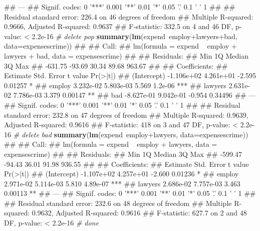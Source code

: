 \documentclass[11pt,]{article}
\newenvironment{Shaded}{\begin{snugshade}}{\end{snugshade}}
\newcommand{\KeywordTok}[1]{\textcolor[rgb]{0.13,0.29,0.53}{\textbf{{#1}}}}
\newcommand{\DataTypeTok}[1]{\textcolor[rgb]{0.13,0.29,0.53}{{#1}}}
\newcommand{\CommentTok}[1]{\textcolor[rgb]{0.56,0.35,0.01}{\textit{{#1}}}}
\newcommand{\NormalTok}[1]{{#1}}
\begin{document}
\begin{Shaded}
\begin{Highlighting}[]
\NormalTok{## ---}
\NormalTok{## Signif. codes:  0 '***' 0.001 '**' 0.01 '*' 0.05 '.' 0.1 ' ' 1}
\NormalTok{## }
\NormalTok{## Residual standard error: 226.4 on 46 degrees of freedom}
\NormalTok{## Multiple R-squared:  0.9666, Adjusted R-squared:  0.9637 }
\NormalTok{## F-statistic: 332.5 on 4 and 46 DF,  p-value: < 2.2e-16}
\CommentTok{# delete pop}
\KeywordTok{summary}\NormalTok{(}\KeywordTok{lm}\NormalTok{(expend~employ+lawyers+bad, }\DataTypeTok{data=}\NormalTok{expensescrime))}
\NormalTok{## }
\NormalTok{## Call:}
\NormalTok{## lm(formula = expend ~ employ + lawyers + bad, data = expensescrime)}
\NormalTok{## }
\NormalTok{## Residuals:}
\NormalTok{##     Min      1Q  Median      3Q     Max }
\NormalTok{## -631.75  -93.69   30.34   89.68  963.67 }
\NormalTok{## }
\NormalTok{## Coefficients:}
\NormalTok{##               Estimate Std. Error t value Pr(>|t|)    }
\NormalTok{## (Intercept) -1.106e+02  4.261e+01  -2.595  0.01257 *  }
\NormalTok{## employ       3.232e-02  5.803e-03   5.569  1.2e-06 ***}
\NormalTok{## lawyers      2.631e-02  7.786e-03   3.379  0.00147 ** }
\NormalTok{## bad         -8.627e-01  9.042e-01  -0.954  0.34496    }
\NormalTok{## ---}
\NormalTok{## Signif. codes:  0 '***' 0.001 '**' 0.01 '*' 0.05 '.' 0.1 ' ' 1}
\NormalTok{## }
\NormalTok{## Residual standard error: 232.8 on 47 degrees of freedom}
\NormalTok{## Multiple R-squared:  0.9639, Adjusted R-squared:  0.9616 }
\NormalTok{## F-statistic:   418 on 3 and 47 DF,  p-value: < 2.2e-16}
\CommentTok{# delete bad}
\KeywordTok{summary}\NormalTok{(}\KeywordTok{lm}\NormalTok{(expend~employ+lawyers, }\DataTypeTok{data=}\NormalTok{expensescrime))}
\NormalTok{## }
\NormalTok{## Call:}
\NormalTok{## lm(formula = expend ~ employ + lawyers, data = expensescrime)}
\NormalTok{## }
\NormalTok{## Residuals:}
\NormalTok{##     Min      1Q  Median      3Q     Max }
\NormalTok{## -599.47  -94.43   36.01   91.98  936.55 }
\NormalTok{## }
\NormalTok{## Coefficients:}
\NormalTok{##               Estimate Std. Error t value Pr(>|t|)    }
\NormalTok{## (Intercept) -1.107e+02  4.257e+01  -2.600  0.01236 *  }
\NormalTok{## employ       2.971e-02  5.114e-03   5.810 4.89e-07 ***}
\NormalTok{## lawyers      2.686e-02  7.757e-03   3.463  0.00113 ** }
\NormalTok{## ---}
\NormalTok{## Signif. codes:  0 '***' 0.001 '**' 0.01 '*' 0.05 '.' 0.1 ' ' 1}
\NormalTok{## }
\NormalTok{## Residual standard error: 232.6 on 48 degrees of freedom}
\NormalTok{## Multiple R-squared:  0.9632, Adjusted R-squared:  0.9616 }
\NormalTok{## F-statistic: 627.7 on 2 and 48 DF,  p-value: < 2.2e-16}
\CommentTok{# done}
\end{Highlighting}
\end{Shaded}
\end{document}
